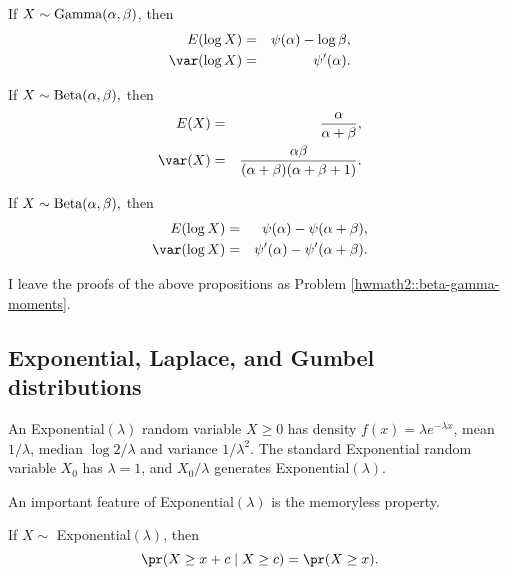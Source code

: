 \begin{proposition}
\label{thm:gammamoments-log}If $X\sim\textup{Gamma}(\alpha,\beta)$,
then
\begin{eqnarray*}
E(\log X)  &=&  \psi(\alpha) - \log \beta ,\\ 
\var(\log X) &=& \psi'(\alpha). 
\end{eqnarray*}
\end{proposition}


\begin{proposition}
\label{thm:beta-moments}If $X\sim\textup{Beta}(\alpha,\beta),$ then
\begin{eqnarray*}
E(X)  &=&  \frac{\alpha}{\alpha+\beta},\\
\var(X) &=& \frac{\alpha\beta}{(\alpha+\beta)(\alpha+\beta+1)}.
\end{eqnarray*}
\end{proposition}

\begin{proposition}
\label{thm:beta-moments-log}If $X\sim\textup{Beta}(\alpha,\beta),$ then
\begin{eqnarray*}
E(\log X)  &=& \psi(\alpha) - \psi(\alpha + \beta) ,\\ 
\var(\log X) &=& \psi ' (\alpha) - \psi ' (\alpha + \beta) . 
\end{eqnarray*}
\end{proposition}


%
I leave the proofs of the above propositions as Problem \ref{hwmath2::beta-gamma-moments}. 



\subsection{Exponential, Laplace, and Gumbel distributions}
\label{subsec::expo-gumbel}

An Exponential$(\lambda)$ random variable $X \geq 0$ has density $f(x) = \lambda e^{-\lambda x}$, mean $1/\lambda$, median $\log 2/\lambda $ and variance $1/\lambda^2$.  The standard Exponential random variable $X_0$ has $\lambda = 1$, and $X_0 / \lambda$ generates Exponential$(\lambda)$. 



An important feature of Exponential$(\lambda)$ is the memoryless property.

\begin{proposition}
\label{prop::memoryless}
If $X\sim $ Exponential$(\lambda)$, then 
$$
\pr(X \geq x+c \mid X\geq c) =\pr(X \geq x).
$$
\end{proposition}

